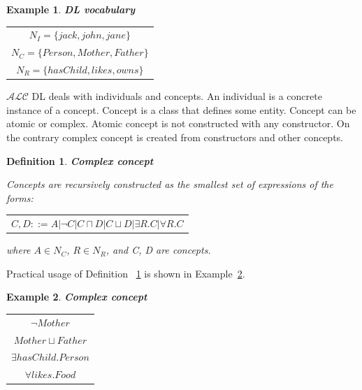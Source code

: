 \documentclass[12pt,a4paper]{article}
\newtheorem{definition}{Definition}[subsection]
\newtheorem{example}{Example}[subsection]
\begin{document}
\begin{example}{\textbf{DL vocabulary}}
	
	\begin{table}[H]
		\centering
		\begin{tabular}{c}
			$ N_{I} = \{ jack, john, jane \} $ \\
			\addlinespace[0.4cm]
			$ N_{C} = \{ Person, Mother, Father \} $ \\
			\addlinespace[0.4cm]
			$ N_{R} = \{ hasChild, likes, owns \} $
		\end{tabular}
	\end{table}
\end{example}

$\mathcal{ALC}$ DL deals with individuals and concepts. An individual is a concrete instance of a concept. Concept is a class that defines some entity. Concept can be atomic or complex. Atomic concept is not constructed with any constructor. On the contrary complex concept is created from constructors and other concepts.

\begin{definition}{\textbf{Complex concept}}
	\label{def:complexConcept}
	
	Concepts are recursively constructed as the smallest set of expressions of the forms:

	\begin{table}[H]
		\centering
		\begin{tabular}{c}
			$ C,D ::= A | \neg C | C \sqcap D | C \sqcup D | \exists R.C | \forall R.C $
		\end{tabular}
	\end{table}

	where $A \in N_{C}$, $R \in N_{R}$, and C, D are concepts.
\end{definition}

Practical usage of Definition ~\ref{def:complexConcept} is shown in Example~\ref{example:complexConcept}.

\begin{example}{\textbf{Complex concept}}
	\label{example:complexConcept}
	
	\begin{table}[H]
		\centering
		\begin{tabular}{c}
			$ \neg Mother $ \\
			\addlinespace[0.4cm]
			$ Mother \sqcup Father $ \\
			\addlinespace[0.4cm]			
			$ \exists hasChild.Person $ \\
			\addlinespace[0.4cm]			
			$ \forall likes.Food $ \\
		\end{tabular}
	\end{table}
\end{example}
\end{document}
